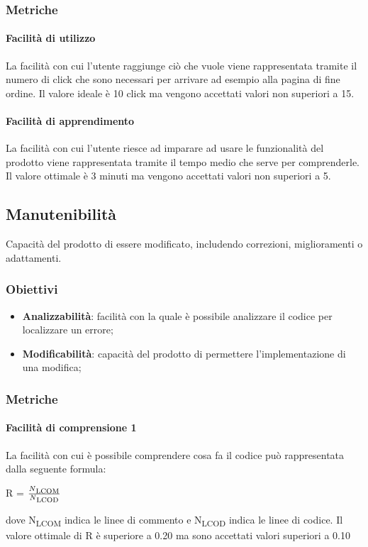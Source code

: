 		\subsubsection{Metriche}
			\paragraph{Facilità di utilizzo}
			La facilità con cui l'utente raggiunge ciò che vuole viene rappresentata tramite il numero di click che sono necessari per arrivare ad esempio alla pagina di fine ordine. Il valore ideale è 10 click ma vengono accettati valori non superiori a 15.
			\paragraph{Facilità di apprendimento}
			La facilità con cui l'utente riesce ad imparare ad usare le funzionalità del prodotto viene rappresentata tramite il tempo medio che serve per comprenderle. Il valore ottimale è 3 minuti ma vengono accettati valori non superiori a 5.
	\subsection{Manutenibilità}
	Capacità del prodotto di essere modificato, includendo correzioni, miglioramenti o adattamenti.
		\subsubsection{Obiettivi}
		\begin{itemize}
			\item \textbf{Analizzabilità}: facilità con la quale è possibile analizzare il codice per localizzare un errore;
			\item \textbf{Modificabilità}: capacità del prodotto di permettere l'implementazione di una modifica;
		\end{itemize}
		\subsubsection{Metriche}
			\paragraph{Facilità di comprensione 1}
			La facilità con cui è possibile comprendere cosa fa il codice può rappresentata dalla seguente formula: \\
			\centerline{R = \(\frac{N\textsubscript{LCOM}}{N\textsubscript{LCOD}} \) }
			dove N\textsubscript{LCOM} indica le linee di commento e N\textsubscript{LCOD} indica le linee di codice. Il valore ottimale di R è superiore a 0.20 ma sono accettati valori superiori a 0.10
